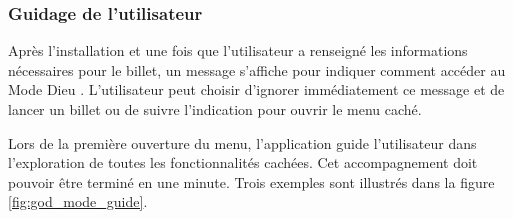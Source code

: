 \documentclass[a4paper]{article}
\newcommand{\modedieu}{\og Mode Dieu \fg}
\begin{document}
\subsubsection{Guidage de l'utilisateur}
Après l'installation et une fois que l'utilisateur a renseigné les informations nécessaires pour le billet,
un message s'affiche pour indiquer comment accéder au \modedieu.
L'utilisateur peut choisir d'ignorer immédiatement ce message et de lancer un billet ou de suivre
l'indication pour ouvrir le menu caché.

Lors de la première ouverture du menu, l'application guide l'utilisateur dans l'exploration de toutes les fonctionnalités cachées.
Cet accompagnement doit pouvoir être terminé en une minute.
Trois exemples sont illustrés dans la figure \ref*{fig:god_mode_guide}.


\begin{figure}[hb]
  \begin{center}
\end{center}
\end{figure}
\end{document}
